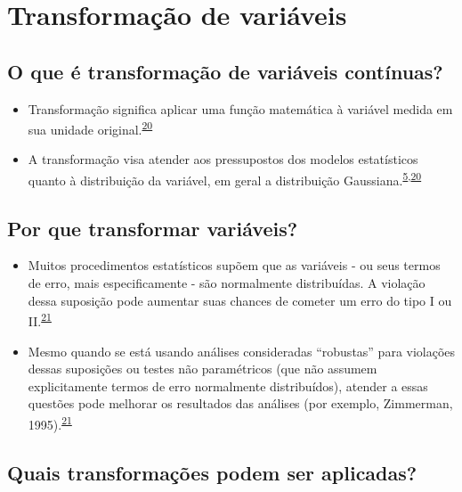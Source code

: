 \documentclass[
]{book}
\begin{document}
\hypertarget{transformacao}{%
\section{Transformação de variáveis}\label{transformacao}}

\hypertarget{o-que-uxe9-transformauxe7uxe3o-de-variuxe1veis-contuxednuas}{%
\subsection{O que é transformação de variáveis contínuas?}\label{o-que-uxe9-transformauxe7uxe3o-de-variuxe1veis-contuxednuas}}

\begin{itemize}
\item
  Transformação significa aplicar uma função matemática à variável medida em sua unidade original.\textsuperscript{\protect\hyperlink{ref-Bland1996}{20}}
\item
  A transformação visa atender aos pressupostos dos modelos estatísticos quanto à distribuição da variável, em geral a distribuição Gaussiana.\textsuperscript{\protect\hyperlink{ref-vetter2017}{5},\protect\hyperlink{ref-Bland1996}{20}}
\end{itemize}

\hypertarget{por-que-transformar-variuxe1veis}{%
\subsection{Por que transformar variáveis?}\label{por-que-transformar-variuxe1veis}}

\begin{itemize}
\item
  Muitos procedimentos estatísticos supõem que as variáveis - ou seus termos de erro, mais especificamente - são normalmente distribuídas. A violação dessa suposição pode aumentar suas chances de cometer um erro do tipo I ou II.\textsuperscript{\protect\hyperlink{ref-osborne2010}{21}}
\item
  Mesmo quando se está usando análises consideradas ``robustas'' para violações dessas suposições ou testes não paramétricos (que não assumem explicitamente termos de erro normalmente distribuídos), atender a essas questões pode melhorar os resultados das análises (por exemplo, Zimmerman, 1995).\textsuperscript{\protect\hyperlink{ref-osborne2010}{21}}
\end{itemize}

\hypertarget{quais-transformauxe7uxf5es-podem-ser-aplicadas}{%
\subsection{Quais transformações podem ser aplicadas?}\label{quais-transformauxe7uxf5es-podem-ser-aplicadas}}
\end{document}
